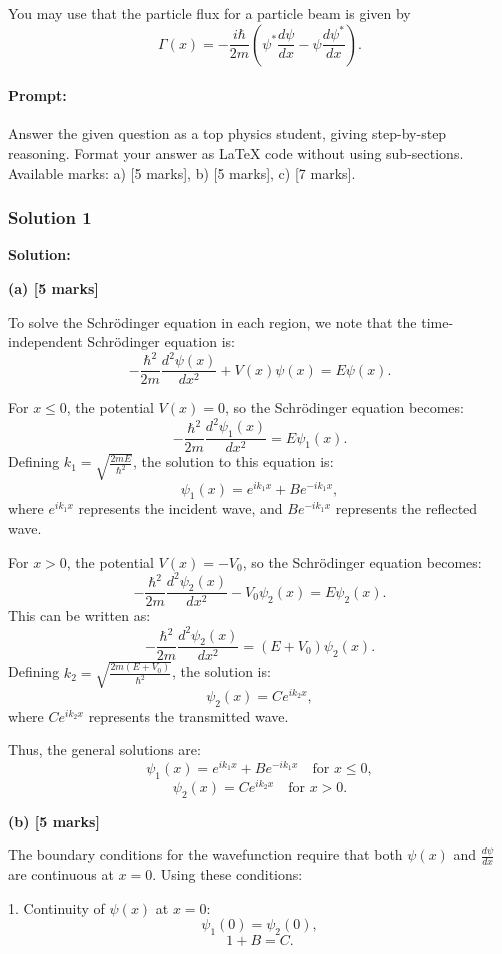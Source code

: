 \documentclass{article}
\begin{document}
You may use that the particle flux for a particle beam is given by
\[
\Gamma(x) = -\frac{i\hbar}{2m} \left( \psi^* \frac{d\psi}{dx} - \psi \frac{d\psi^*}{dx} \right).
\]


\paragraph{Prompt: \\} 
Answer the given question as a top physics student, giving step-by-step reasoning. Format your answer as LaTeX code without using sub-sections. Available marks: a) [5 marks], b) [5 marks], c) [7 marks].


\subsubsection{Solution 1}
\textbf{Solution:}

\textbf{(a) [5 marks]}

To solve the Schrödinger equation in each region, we note that the time-independent Schrödinger equation is:
\[
-\frac{\hbar^2}{2m} \frac{d^2 \psi(x)}{dx^2} + V(x) \psi(x) = E \psi(x).
\]

For $x \leq 0$, the potential $V(x) = 0$, so the Schrödinger equation becomes:
\[
-\frac{\hbar^2}{2m} \frac{d^2 \psi_1(x)}{dx^2} = E \psi_1(x).
\]
Defining $k_1 = \sqrt{\frac{2mE}{\hbar^2}}$, the solution to this equation is:
\[
\psi_1(x) = e^{ik_1x} + Be^{-ik_1x},
\]
where $e^{ik_1x}$ represents the incident wave, and $Be^{-ik_1x}$ represents the reflected wave.

For $x > 0$, the potential $V(x) = -V_0$, so the Schrödinger equation becomes:
\[
-\frac{\hbar^2}{2m} \frac{d^2 \psi_2(x)}{dx^2} - V_0 \psi_2(x) = E \psi_2(x).
\]
This can be written as:
\[
-\frac{\hbar^2}{2m} \frac{d^2 \psi_2(x)}{dx^2} = (E + V_0) \psi_2(x).
\]
Defining $k_2 = \sqrt{\frac{2m(E + V_0)}{\hbar^2}}$, the solution is:
\[
\psi_2(x) = Ce^{ik_2x},
\]
where $Ce^{ik_2x}$ represents the transmitted wave.

Thus, the general solutions are:
\[
\psi_1(x) = e^{ik_1x} + Be^{-ik_1x} \quad \text{for } x \leq 0,
\]
\[
\psi_2(x) = Ce^{ik_2x} \quad \text{for } x > 0.
\]

\textbf{(b) [5 marks]}

The boundary conditions for the wavefunction require that both $\psi(x)$ and $\frac{d\psi}{dx}$ are continuous at $x = 0$. Using these conditions:

1. Continuity of $\psi(x)$ at $x = 0$:
\[
\psi_1(0) = \psi_2(0),
\]
\[
1 + B = C.
\]
\end{document}
